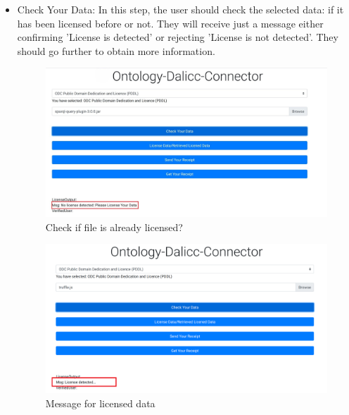\begin{itemize}
\begin{center}
\begin{figure}[htb!]
	\end{figure}
\end{center}
	\item Check Your Data:
	In this step, the user should check the selected data: if it has been licensed before or not. They will receive just a message either confirming 'License is detected' or rejecting 'License is not detected'. They should go further to obtain more information.
    \begin{center}
	\begin{figure}[htb!]
		
		\begin{minipage}{0.45\linewidth}
			\centering
			\includegraphics[width=1.95\textwidth]{images/chap03_checkFile.jpg}
		\end{minipage}
		\caption[Check if file is already licensed?]{Check if file is already licensed?}
		
	\end{figure}
	
\end{center}

\begin{center}
	\begin{figure}[htb!]
		
		\begin{minipage}{0.45\linewidth}
			\centering
			\includegraphics[width=1.95\textwidth]{images/chap03_found_license.png}
		\end{minipage}
		\caption[Message for licensed data]{Message for licensed data}
		

\end{figure}
\end{center}
\end{itemize}

